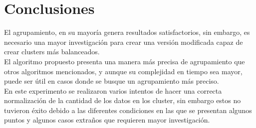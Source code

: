 \documentclass[runningheads]{llncs}
\begin{document}
\section{Conclusiones}
El agrupamiento, en su mayoría genera resultados satisfactorios, sin embargo, es necesario
una mayor investigación para crear una versión modificada capaz de crear clusters más
balanceados.
\\
El algoritmo propuesto presenta una manera más precisa de agrupamiento que otros
algoritmos mencionados, y aunque su complejidad en tiempo sea mayor, puede ser útil
en casos donde se busque un agrupamiento más preciso.
\\
En este experimento se realizaron varios intentos de hacer una correcta normalización
de la cantidad de los datos en los cluster, sin embargo estos no tuvieron éxito debido
a las diferentes condiciones en las que se presentan algunos puntos y algunos casos extraños
que requieren mayor investigación.
% 
%
%
\renewcommand{\refname}{Referencias}


\end{document}

